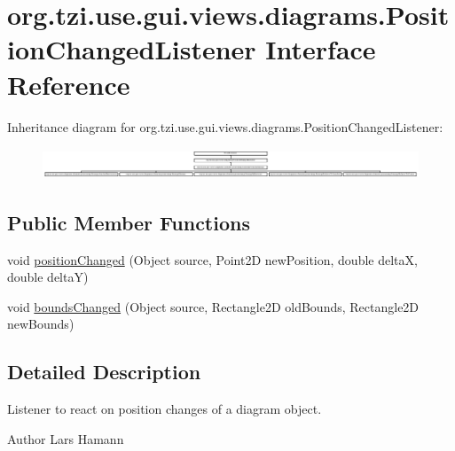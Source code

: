 \hypertarget{interfaceorg_1_1tzi_1_1use_1_1gui_1_1views_1_1diagrams_1_1_position_changed_listener}{\section{org.\-tzi.\-use.\-gui.\-views.\-diagrams.\-Position\-Changed\-Listener Interface Reference}
\label{interfaceorg_1_1tzi_1_1use_1_1gui_1_1views_1_1diagrams_1_1_position_changed_listener}
}
Inheritance diagram for org.\-tzi.\-use.\-gui.\-views.\-diagrams.\-Position\-Changed\-Listener\-:\begin{figure}[H]
\begin{center}
\leavevmode
\includegraphics[height=0.945148cm]{interfaceorg_1_1tzi_1_1use_1_1gui_1_1views_1_1diagrams_1_1_position_changed_listener}
\end{center}
\end{figure}
\subsection*{Public Member Functions}
\begin{DoxyCompactItemize}
\item 
void \hyperlink{interfaceorg_1_1tzi_1_1use_1_1gui_1_1views_1_1diagrams_1_1_position_changed_listener_ad4f033c6badea5d6cafdd0b5d62dac37}{position\-Changed} (Object source, Point2\-D new\-Position, double delta\-X, double delta\-Y)
\item 
void \hyperlink{interfaceorg_1_1tzi_1_1use_1_1gui_1_1views_1_1diagrams_1_1_position_changed_listener_a3b7c4abd5a06c9ed1a83999e0ab17c9d}{bounds\-Changed} (Object source, Rectangle2\-D old\-Bounds, Rectangle2\-D new\-Bounds)
\end{DoxyCompactItemize}


\subsection{Detailed Description}
Listener to react on position changes of a diagram object.

\begin{DoxyAuthor}{Author}
Lars Hamann 
\end{DoxyAuthor}


